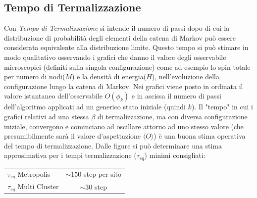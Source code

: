 \subsection{Tempo di Termalizzazione}
Con \emph{Tempo di Termalizzazione} si intende il numero di passi dopo di cui la distribuzione di probabilità degli elementi della catena di Markov può essere considerata equivalente alla distribuzione limite.
\newline
Questo tempo si può stimare in modo qualitativo osservando i grafici che danno il valore degli osservabile microscopici (definiti sulla singola configurazione) come ad esempio lo spin totale per numero di nodi($M$) e la densità di energia($H$), nell'evoluzione della configurazione lungo la catena di Markov. \newline
Nei grafici viene posto in ordinata il valore istantaneo dell'osservabile $O(\phi_k)$ e in ascissa il numero di passi dell'algoritmo applicati ad un generico stato iniziale (quindi $k$). 
Il "tempo" in cui i grafici relativi ad una stessa $\beta$ di termalizzazione, ma con diversa configurazione iniziale, convergono e cominciano ad oscillare attorno ad uno stesso valore (che presumibilmente sarà il valore d'aspettazione $\langle O \rangle$) è una buona stima operativa del tempo di termalizzazione.
Dalle figure si può determinare una stima approsimativa per i tempi termalizzazione ($\tau_{eq}$) minimi consigliati:
\begin{center}
\begin{tabular}{|l|c|}
  \hline
  $\tau_{eq}$ Metropolis & $\sim 150$ step per sito \\
  $\tau_{eq}$ Multi Cluster & $\sim 30$ step\\ 
  \hline
\end{tabular}
\end{center}

\clearpage

